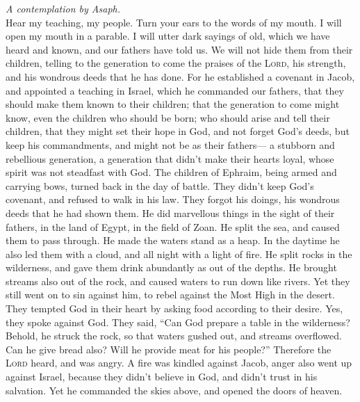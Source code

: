 \emph{A contemplation by Asaph.}\\
 Hear my teaching, my people. Turn your ears to the words
of my mouth.  I will open my mouth in a parable. I will
utter dark sayings of old,  which we have heard and known,
and our fathers have told us.  We will not hide them from
their children, telling to the generation to come the praises of the
\textsc{Lord}, his strength, and his wondrous deeds that he has done.
 For he established a covenant in Jacob, and appointed a
teaching in Israel, which he commanded our fathers, that they should
make them known to their children;  that the generation to
come might know, even the children who should be born; who should arise
and tell their children,  that they might set their hope
in God, and not forget God's deeds, but keep his commandments,
 and might not be as their fathers--- a stubborn and
rebellious generation, a generation that didn't make their hearts loyal,
whose spirit was not steadfast with God.  The children of
Ephraim, being armed and carrying bows, turned back in the day of
battle.  They didn't keep God's covenant, and refused to
walk in his law.  They forgot his doings, his wondrous
deeds that he had shown them.  He did marvellous things
in the sight of their fathers, in the land of Egypt, in the field of
Zoan.  He split the sea, and caused them to pass through.
He made the waters stand as a heap.  In the daytime he
also led them with a cloud, and all night with a light of fire.
 He split rocks in the wilderness, and gave them drink
abundantly as out of the depths.  He brought streams also
out of the rock, and caused waters to run down like rivers.
 Yet they still went on to sin against him, to rebel
against the Most High in the desert.  They tempted God in
their heart by asking food according to their desire. 
Yes, they spoke against God. They said, ``Can God prepare a table in the
wilderness?  Behold, he struck the rock, so that waters
gushed out, and streams overflowed. Can he give bread also? Will he
provide meat for his people?''  Therefore the
\textsc{Lord} heard, and was angry. A fire was kindled against Jacob,
anger also went up against Israel,  because they didn't
believe in God, and didn't trust in his salvation.  Yet
he commanded the skies above, and opened the doors of heaven.

